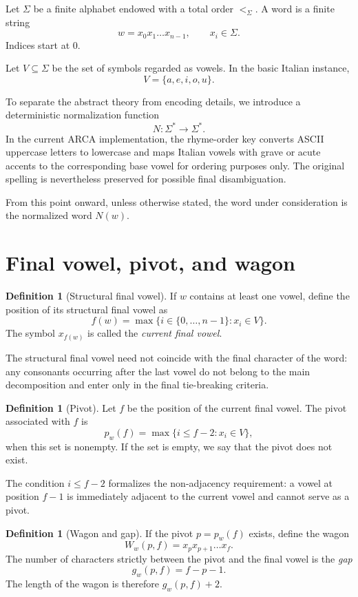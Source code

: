 \documentclass[11pt,a4paper]{article}
\theoremstyle{definition}
\newtheorem{definition}[theorem]{Definition}
\theoremstyle{remark}
\newcommand{\Nrm}{N}
\newcommand{\Pivot}{p_w}
\newcommand{\Gap}{g_w}
\newcommand{\Vag}{W_w}
\begin{document}
Let $\Sigma$ be a finite alphabet endowed with a total order $<_{\Sigma}$. A word is a finite string
\[
  w=x_0x_1\dots x_{n-1},\qquad x_i\in\Sigma.
\]
Indices start at $0$.

Let $V\subseteq\Sigma$ be the set of symbols regarded as vowels. In the basic Italian instance,
\[
  V=\{a,e,i,o,u\}.
\]

To separate the abstract theory from encoding details, we introduce a deterministic normalization function
\[
  \Nrm:\Sigma^*\longrightarrow\Sigma^*.
\]
In the current ARCA implementation, the rhyme-order key converts ASCII uppercase letters to lowercase and maps Italian vowels with grave or acute accents to the corresponding base vowel for ordering purposes only. The original spelling is nevertheless preserved for possible final disambiguation.

From this point onward, unless otherwise stated, the word under consideration is the normalized word $\Nrm(w)$.

\section{Final vowel, pivot, and wagon}

\begin{definition}[Structural final vowel]
If $w$ contains at least one vowel, define the position of its structural final vowel as
\[
  f(w)=\max\{i\in\{0,\dots,n-1\}:x_i\in V\}.
\]
The symbol $x_{f(w)}$ is called the \emph{current final vowel}.
\end{definition}

The structural final vowel need not coincide with the final character of the word: any consonants occurring after the last vowel do not belong to the main decomposition and enter only in the final tie-breaking criteria.

\begin{definition}[Pivot]
Let $f$ be the position of the current final vowel. The pivot associated with $f$ is
\[
  \Pivot(f)=\max\{i\leq f-2:x_i\in V\},
\]
when this set is nonempty. If the set is empty, we say that the pivot does not exist.
\end{definition}

The condition $i\leq f-2$ formalizes the non-adjacency requirement: a vowel at position $f-1$ is immediately adjacent to the current vowel and cannot serve as a pivot.

\begin{definition}[Wagon and gap]
If the pivot $p=\Pivot(f)$ exists, define the wagon
\[
  \Vag(p,f)=x_px_{p+1}\dots x_f.
\]
The number of characters strictly between the pivot and the final vowel is the \emph{gap}
\[
  \Gap(p,f)=f-p-1.
\]
The length of the wagon is therefore $\Gap(p,f)+2$.
\end{definition}
\end{document}
